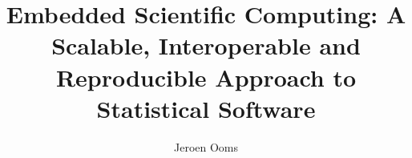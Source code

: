 \documentclass[PhD]{uclathes}\usepackage[]{graphicx}\usepackage[]{color}
\title{Embedded Scientific Computing: A Scalable, Interoperable and Reproducible Approach to Statistical Software}
\author{Jeroen Ooms}
\begin{document}
\makeintropages












\end{document}
